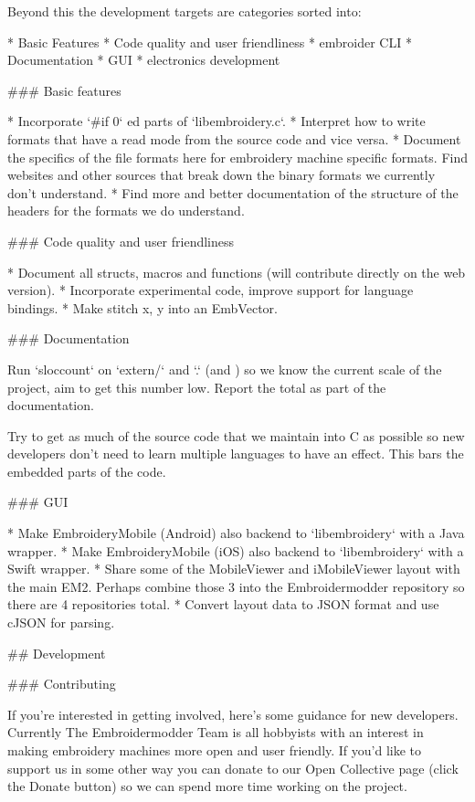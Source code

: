 Beyond this the development targets are categories sorted into:

* Basic Features
* Code quality and user friendliness
* embroider CLI
* Documentation
* GUI
* electronics development

### Basic features

* Incorporate `\#if 0` ed parts of `libembroidery.c`.
* Interpret how to write formats that have a read mode from the source code and vice versa.
* Document the specifics of the file formats here for embroidery machine specific formats. Find websites and other sources that break down the binary formats we currently don't understand.
* Find more and better documentation of the structure of the headers for the formats we do understand.

### Code quality and user friendliness

* Document all structs, macros and functions (will contribute directly on the web version).
* Incorporate experimental code, improve support for language bindings.
* Make stitch x, y into an EmbVector.

### Documentation

Run `sloccount` on `extern/` and `.` (and ) so we know the
current scale of the project, aim to get this number low. Report the total as
part of the documentation.

Try to get as much of the source code that we maintain into C as possible so
new developers don't need to learn multiple languages to have an effect. This
bars the embedded parts of the code.

### GUI

* Make EmbroideryMobile (Android) also backend to `libembroidery` with a Java wrapper.
* Make EmbroideryMobile (iOS) also backend to `libembroidery` with a Swift wrapper.
* Share some of the MobileViewer and iMobileViewer layout with the main EM2. Perhaps combine those 3 into the Embroidermodder repository so there are 4 repositories total.
* Convert layout data to JSON format and use cJSON for parsing.

## Development

### Contributing

If you're interested in getting involved, here's some guidance
for new developers. Currently The Embroidermodder Team is all
hobbyists with an interest in making embroidery machines more
open and user friendly. If you'd like to support us in some other way
you can donate to our Open Collective page (click the Donate button) so
we can spend more time working on the project.


